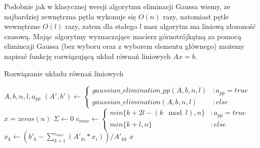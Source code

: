 \documentclass[11pt]{article}
\begin{document}
        \noindent
        Podobnie jak w klasycznej wersji algorytmu eliminacji Gaussa wiemy, ze najbardziej zewnętrzna pętla wykonuje się $O(n)$ razy, natomiast pętle wewnętrzne $O(l)$ razy, zatem dla stałego $l$ nasz algorytm ma liniową złozoność czasową.
        \newline\newline\newline
        Mając algorytmy wyznaczające macierz górnotrójkątną za pomocą elimincaji Gaussa (bez wyboru oraz z wyborem elementu głównego) możemy napisać funkcję rozwiązującą układ równań liniowych $Ax = b$.

        \newpage

        \begin{algorithm}[h!]
        \caption{Rozwiązanie układu równań liniowych}
        \label{alg:solve_equation_system}
        \begin{algorithmic}[1]
            \Require $A, b, n, l, a_{pp}$
            \State
                $
                (A', b') \gets
                \begin{cases}
                    gaussian\_elimination\_pp(A, b, n, l) & : a_{pp} = true \\
                    gaussian\_elimination(A, b, n, l) & : else
                \end{cases}
                $
            \State $x = zeros(n)$
                \State $\Sigma \gets 0$
                \State
                $
                c_{max} \gets
                \begin{cases}
                    min\{k + 2l - (k \mod l), n\} & : a_{pp} = true \\
                    min\{k + l, n\} & : else
                \end{cases}
                $
                \State $x_k \gets (b'_k - \sum_{k + 1}^{c_{max}}(A'_{ki} * x_i)) / A'_{kk}$
            \EndFor
            \State \Return $x$
        \end{algorithmic}
        \end{algorithm}
\end{document}
